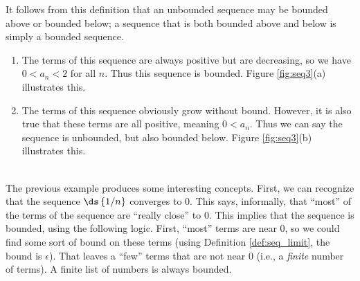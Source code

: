 \enlargethispage{2\baselineskip}
It follows from this definition that an unbounded sequence may be bounded above or bounded below; a sequence that is both bounded above and below is simply a bounded sequence.\\

{\begin{enumerate}
\item		The terms of this sequence are always positive but are decreasing, so we have $0<a_n<2$ for all $n$. Thus this sequence is bounded. Figure \ref{fig:seq3}(a) illustrates this.


\item		The terms of this sequence obviously grow without bound. However, it is also true that these terms are all positive, meaning $0<a_n$. Thus we can say the sequence is unbounded, but also bounded below. Figure \ref{fig:seq3}(b) illustrates this.

\end{enumerate}
 \baselineskip
}\\


The previous example produces some interesting concepts. First, we can recognize that the sequence $\ds\left\{1/n\right\}$ converges to 0. This says, informally, that ``most'' of the terms of the sequence are ``really close'' to 0. This implies that the sequence is bounded, using the following logic. First, ``most'' terms are near 0, so we could find some sort of bound on these terms (using Definition \ref{def:seq_limit}, the bound is $\epsilon$). That leaves a ``few'' terms that are not near 0 (i.e., a \emph{finite} number of terms). A finite list of numbers is always bounded. 

